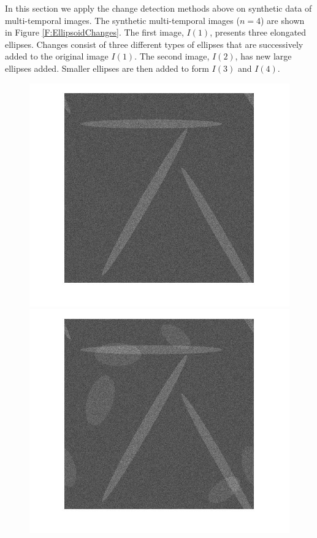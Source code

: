 \documentclass[journal]{IEEEtran}
\begin{document}
In this section we apply the change detection methods above on synthetic data of multi-temporal images. 
The synthetic multi-temporal images ($n=4$) are shown in Figure \ref{F:EllipsoidChanges}. The first image, $I(1)$, presents three elongated ellipses. Changes consist of three different types of ellipses that are successively added to the original image $I(1)$. The second image, $I(2)$, has new large ellipses added. Smaller ellipses are then added to form $I(3)$ and $I(4)$. 

\begin{figure}[htb!]
\centering
\includegraphics[scale=.17]{../../figs/ellipses_t1}
\includegraphics[scale=.17]{../../figs/ellipses_t2}

\end{figure}
\end{document}
